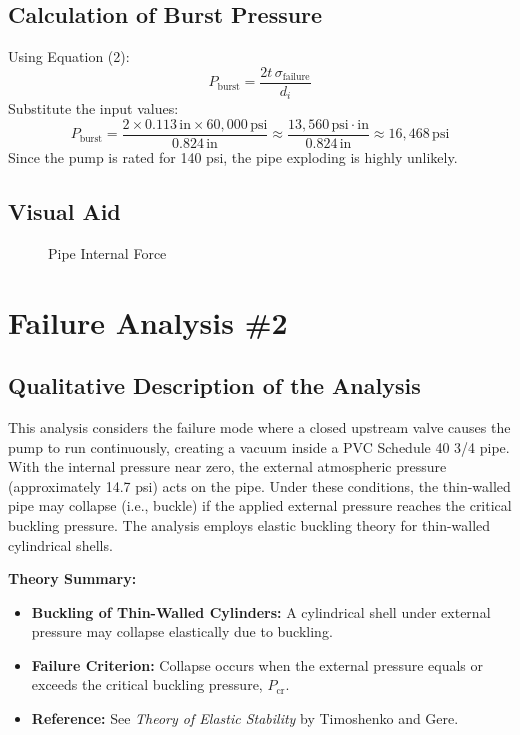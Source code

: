 \documentclass[12pt]{report}
\begin{document}
\subsection{Calculation of Burst Pressure}
Using Equation (2):
\[
P_{\text{burst}} = \frac{2t\, \sigma_{\text{failure}}}{d_i}
\]
Substitute the input values:
\[
P_{\text{burst}} = \frac{2 \times 0.113\,\text{in} \times 60,000\,\text{psi}}{0.824\,\text{in}} \approx \frac{13,560\,\text{psi}\cdot\text{in}}{0.824\,\text{in}} \approx 16,468\,\text{psi}
\]
Since the pump is rated for 140 psi, the pipe exploding is highly unlikely.

\subsection{Visual Aid}
\begin{figure}[!ht]
\centering
{}%
\label{fig:expo_pipe}
\caption{Pipe Internal Force}
\end{figure}
\newpage

\section{Failure Analysis \#2}

\subsection{Qualitative Description of the Analysis}
This analysis considers the failure mode where a closed upstream valve causes the pump to run continuously, creating a vacuum inside a PVC Schedule 40 3/4 pipe. With the internal pressure near zero, the external atmospheric pressure (approximately 14.7 psi) acts on the pipe. Under these conditions, the thin-walled pipe may collapse (i.e., buckle) if the applied external pressure reaches the critical buckling pressure. The analysis employs elastic buckling theory for thin-walled cylindrical shells.

\noindent\textbf{Theory Summary:}
\begin{itemize}
    \item \textbf{Buckling of Thin-Walled Cylinders:} A cylindrical shell under external pressure may collapse elastically due to buckling.
    \item \textbf{Failure Criterion:} Collapse occurs when the external pressure equals or exceeds the critical buckling pressure, \(P_{\text{cr}}\).
    \item \textbf{Reference:} See \emph{Theory of Elastic Stability} by Timoshenko and Gere.
\end{itemize}
\end{document}
